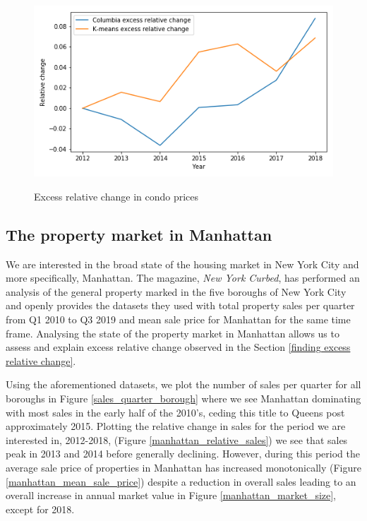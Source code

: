 \begin{figure}[h]
    \centering
    \scalebox{0.5}  
    {\includegraphics{figs/excess_rchange.png}}
    \caption{Excess relative change in condo prices}
    \label{excess_rchange}
\end{figure}

\subsection{The property market in Manhattan}

We are interested in the broad state of the housing market in New York City and more specifically, Manhattan. The magazine, \textit{New York Curbed}, has performed an analysis of the general property marked in the five boroughs of New York City \cite{Curbed analysis} and openly provides the datasets they used with total property sales per quarter from Q1 2010 to Q3 2019 and mean sale price for Manhattan for the same time frame. Analysing the state of the property market in Manhattan allows us to assess and explain excess relative change observed in the Section \ref{finding excess relative change}. 

Using the aforementioned datasets, we plot the number of sales per quarter for all boroughs in Figure \ref{sales_quarter_borough} where we see Manhattan dominating with most sales in the early half of the 2010's, ceding this title to Queens post approximately 2015. Plotting the relative change in sales for the period we are interested in, 2012-2018, (Figure \ref{manhattan_relative_sales}) we see that sales peak in 2013 and 2014 before generally declining. However, during this period the average sale price of properties in Manhattan has increased monotonically (Figure \ref{manhattan_mean_sale_price}) despite a reduction in overall sales leading to an overall increase in annual market value in Figure \ref{manhattan_market_size}, except for 2018. 


